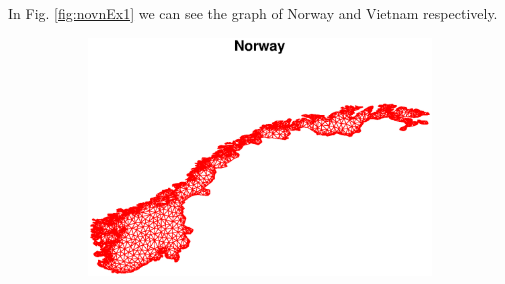 \documentclass[unicode,11pt,a4paper,oneside,numbers=endperiod,openany]{scrartcl}
\begin{document}
In Fig. \ref{fig:novnEx1} we can see the graph of Norway and Vietnam respectively.

\begin{figure}[h!]
	\centering
	\begin{subfigure}[b]{0.48\textwidth}
	\includegraphics[width=\textwidth]{images/NorwayEx1.eps}
	\end{subfigure}
	\hfill
	\begin{subfigure}[b]{0.48\textwidth}

\end{subfigure}
\end{figure}
\end{document}
